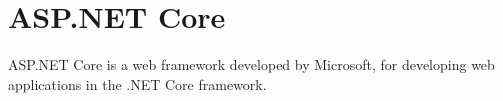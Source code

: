 \section{ASP.NET Core}
ASP.NET Core is a web framework developed by Microsoft, for developing web applications in the .NET Core framework.
